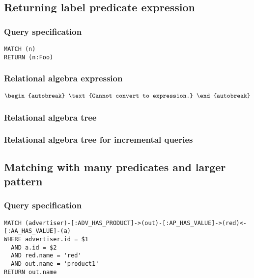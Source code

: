 \subsection{Returning label predicate expression}

\subsubsection*{Query specification}

\begin{lstlisting}
MATCH (n)
RETURN (n:Foo)
\end{lstlisting}

\subsubsection*{Relational algebra expression}

\begin{align*}
\begin{autobreak}
\text{Cannot convert to expression.}
\end{autobreak}
\end{align*}

\subsubsection*{Relational algebra tree}


\subsubsection*{Relational algebra tree for incremental queries}


\subsection{Matching with many predicates and larger pattern}

\subsubsection*{Query specification}

\begin{lstlisting}
MATCH (advertiser)-[:ADV_HAS_PRODUCT]->(out)-[:AP_HAS_VALUE]->(red)<-[:AA_HAS_VALUE]-(a)
WHERE advertiser.id = $1
  AND a.id = $2
  AND red.name = 'red'
  AND out.name = 'product1'
RETURN out.name
\end{lstlisting}

